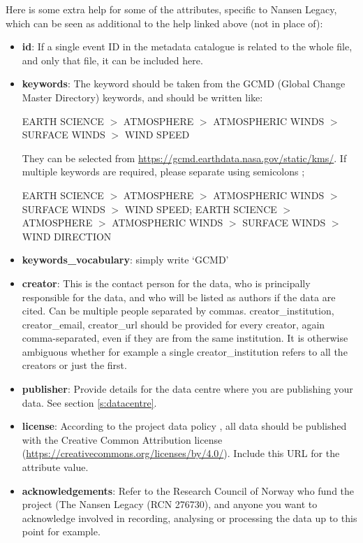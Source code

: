 \documentclass[a4paper,english, 11pt]{article}
\begin{document}
Here is some extra help for some of the attributes, specific to Nansen Legacy, which can be seen as additional to the help linked above (not in place of):
\begin{itemize}
\item \textbf{id}: If a single event ID in the metadata catalogue is related to the whole file, and only that file, it can be included here. 
\item \textbf{keywords}: The keyword should be taken from the GCMD (Global Change Master Directory) keywords, and should be written like:

EARTH SCIENCE $>$ ATMOSPHERE $>$ ATMOSPHERIC WINDS $>$ SURFACE WINDS $>$  WIND SPEED

They can be selected from \url{https://gcmd.earthdata.nasa.gov/static/kms/}.
If multiple keywords are required, please separate using semicolons ;

EARTH SCIENCE $>$ ATMOSPHERE $>$ ATMOSPHERIC WINDS $>$ SURFACE WINDS $>$  WIND SPEED; EARTH SCIENCE $>$ ATMOSPHERE $>$ ATMOSPHERIC WINDS $>$ SURFACE WINDS $>$  WIND DIRECTION

\item \textbf{keywords\_vocabulary}: simply write `GCMD'
\item \textbf{creator}: This is the contact person for the data, who is principally responsible for the data, and who will be listed as authors if the data are cited. Can be multiple people separated by commas. creator\_institution, creator\_email, creator\_url should be provided for every creator, again comma-separated, even if they are from the same institution. It is otherwise ambiguous whether for example a single creator\_institution refers to all the creators or just the first.  
\item \textbf{publisher}: Provide details for the data centre where you are publishing your data. See section \ref{s:datacentre}.
\item \textbf{license}: According to the project data policy \citep{aendatapolicy2021}, all data should be published with the Creative Common Attribution license (\url{https://creativecommons.org/licenses/by/4.0/}). Include this URL for the attribute value. 
\item \textbf{acknowledgements}: Refer to the Research Council of Norway who fund the project (The Nansen Legacy (RCN 276730), and anyone you want to acknowledge involved in recording, analysing or processing the data up to this point for example.
\end{itemize}
\end{document}
